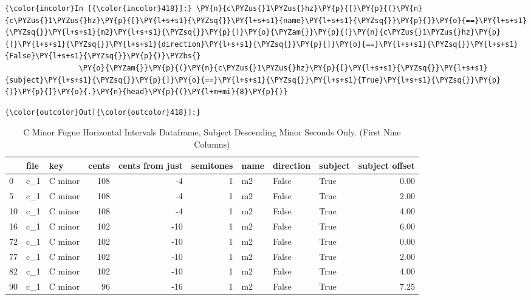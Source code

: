     \begin{Verbatim}[commandchars=\\\{\}]
{\color{incolor}In [{\color{incolor}418}]:} \PY{n}{c\PYZus{}1\PYZus{}hz}\PY{p}{[}\PY{p}{(}\PY{n}{c\PYZus{}1\PYZus{}hz}\PY{p}{[}\PY{l+s+s1}{\PYZsq{}}\PY{l+s+s1}{name}\PY{l+s+s1}{\PYZsq{}}\PY{p}{]}\PY{o}{==}\PY{l+s+s1}{\PYZsq{}}\PY{l+s+s1}{m2}\PY{l+s+s1}{\PYZsq{}}\PY{p}{)}\PY{o}{\PYZam{}}\PY{p}{(}\PY{n}{c\PYZus{}1\PYZus{}hz}\PY{p}{[}\PY{l+s+s1}{\PYZsq{}}\PY{l+s+s1}{direction}\PY{l+s+s1}{\PYZsq{}}\PY{p}{]}\PY{o}{==}\PY{l+s+s1}{\PYZsq{}}\PY{l+s+s1}{False}\PY{l+s+s1}{\PYZsq{}}\PY{p}{)}\PYZbs{}
                 \PY{o}{\PYZam{}}\PY{p}{(}\PY{n}{c\PYZus{}1\PYZus{}hz}\PY{p}{[}\PY{l+s+s1}{\PYZsq{}}\PY{l+s+s1}{subject}\PY{l+s+s1}{\PYZsq{}}\PY{p}{]}\PY{o}{==}\PY{l+s+s1}{\PYZsq{}}\PY{l+s+s1}{True}\PY{l+s+s1}{\PYZsq{}}\PY{p}{)}\PY{p}{]}\PY{o}{.}\PY{n}{head}\PY{p}{(}\PY{l+m+mi}{8}\PY{p}{)}
\end{Verbatim}
\begin{Verbatim}[commandchars=\\\{\}]
{\color{outcolor}Out[{\color{outcolor}418}]:} 
\end{Verbatim}
\begin{singlespace}
\begin{table}[H]
\centering
\tiny
\begin{tabular}{|lllrrrlllr|}
\hline
\textbf{{}} & \textbf{file} & \textbf{     key} & \textbf{ cents} & \textbf{ cents from just} & \textbf{ semitones} & \textbf{name} & \textbf{direction} & \textbf{subject} & \textbf{ subject offset }\\
\hline
0  &  c\_1 &  C minor &    108 &               -4 &          1 &   m2 &     False &    True &            0.00 \\
5  &  c\_1 &  C minor &    108 &               -4 &          1 &   m2 &     False &    True &            2.00 \\
10 &  c\_1 &  C minor &    108 &               -4 &          1 &   m2 &     False &    True &            4.00 \\
16 &  c\_1 &  C minor &    102 &              -10 &          1 &   m2 &     False &    True &            6.00 \\
72 &  c\_1 &  C minor &    102 &              -10 &          1 &   m2 &     False &    True &            0.00 \\
77 &  c\_1 &  C minor &    102 &              -10 &          1 &   m2 &     False &    True &            2.00 \\
82 &  c\_1 &  C minor &    102 &              -10 &          1 &   m2 &     False &    True &            4.00 \\
90 &  c\_1 &  C minor &     96 &              -16 &          1 &   m2 &     False &    True &            7.25 \\
\hline
\end{tabular}
\caption[C minor Fugue Horizontal Intervals Dataframe, Subject Descending Minor Seconds Only. ]{C Minor Fugue Horizontal Intervals Dataframe, Subject Descending Minor Seconds Only. (First Nine Columns)}
\end{table}
\normalsize
\end{singlespace}



